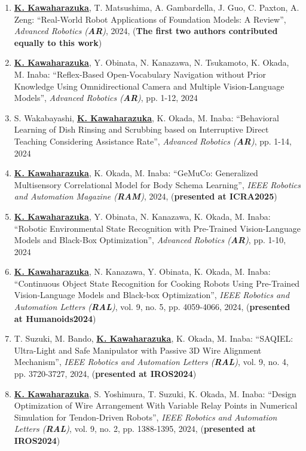 \documentclass[letterpaper]{article}
\begin{document}
\begin{enumerate}
\item \underline{\textbf{K. Kawaharazuka}}, T. Matsushima, A. Gambardella, J. Guo, C. Paxton, A. Zeng: ``Real-World Robot Applications of Foundation Models: A Review'', \textit{Advanced Robotics (\textit{\textbf{AR}})}, 2024, (\textbf{The first two authors contributed equally to this work})
\item \underline{\textbf{K. Kawaharazuka}}, Y. Obinata, N. Kanazawa, N. Tsukamoto, K. Okada, M. Inaba: ``Reflex-Based Open-Vocabulary Navigation without Prior Knowledge Using Omnidirectional Camera and Multiple Vision-Language Models'', \textit{Advanced Robotics (\textit{\textbf{AR}})}, pp. 1-12, 2024
\item S. Wakabayashi, \underline{\textbf{K. Kawaharazuka}}, K. Okada, M. Inaba: ``Behavioral Learning of Dish Rinsing and Scrubbing based on Interruptive Direct Teaching Considering Assistance Rate'', \textit{Advanced Robotics (\textit{\textbf{AR}})}, pp. 1-14, 2024
\item \underline{\textbf{K. Kawaharazuka}}, K. Okada, M. Inaba: ``GeMuCo: Generalized Multisensory Correlational Model for Body Schema Learning'', \textit{IEEE Robotics and Automation Magazine (\textit{\textbf{RAM}})}, 2024, (\textbf{presented at ICRA2025})
\item \underline{\textbf{K. Kawaharazuka}}, Y. Obinata, N. Kanazawa, K. Okada, M. Inaba: ``Robotic Environmental State Recognition with Pre-Trained Vision-Language Models and Black-Box Optimization'', \textit{Advanced Robotics (\textit{\textbf{AR}})}, pp. 1-10, 2024
\item \underline{\textbf{K. Kawaharazuka}}, N. Kanazawa, Y. Obinata, K. Okada, M. Inaba: ``Continuous Object State Recognition for Cooking Robots Using Pre-Trained Vision-Language Models and Black-box Optimization'', \textit{IEEE Robotics and Automation Letters (\textit{\textbf{RAL}})}, vol. 9, no. 5, pp. 4059-4066, 2024, (\textbf{presented at Humanoids2024})
\item T. Suzuki, M. Bando, \underline{\textbf{K. Kawaharazuka}}, K. Okada, M. Inaba: ``SAQIEL: Ultra-Light and Safe Manipulator with Passive 3D Wire Alignment Mechanism'', \textit{IEEE Robotics and Automation Letters (\textit{\textbf{RAL}})}, vol. 9, no. 4, pp. 3720-3727, 2024, (\textbf{presented at IROS2024})
\item \underline{\textbf{K. Kawaharazuka}}, S. Yoshimura, T. Suzuki, K. Okada, M. Inaba: ``Design Optimization of Wire Arrangement With Variable Relay Points in Numerical Simulation for Tendon-Driven Robots'', \textit{IEEE Robotics and Automation Letters (\textit{\textbf{RAL}})}, vol. 9, no. 2, pp. 1388-1395, 2024, (\textbf{presented at IROS2024})

\end{enumerate}
\end{document}
